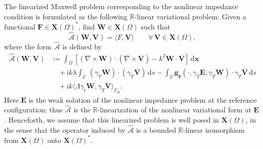 \documentclass[12pt,reqno]{amsart}
\theoremstyle{definition}
\numberwithin{equation}{section}
\begin{document}
The linearized Maxwell problem corresponding to the nonlinear impedance condition is formulated as the following $\mathbb{R}$-linear variational problem: Given a functional $\mathbf{F} \in \mathbf{X}(\Omega)^*$, find $\mathbf{W} \in \mathbf{X}(\Omega)$ such that
\begin{equation}
\widehat{\mathcal{A}}(\mathbf{W}, \mathbf{V}) = \langle F, \mathbf{V} \rangle \qquad \forall \, \mathbf{V} \in \mathbf{X}(\Omega),
\end{equation}
where the form $\widehat{\mathcal{A}}$ is defined by
\begin{equation}
\label{eq:linearized_weak_form}
\begin{aligned}
\widehat{\mathcal{A}}(\mathbf{W}, \mathbf{V}) &:= \int_{\Omega} \left[ (\nabla \times \mathbf{W}) \cdot (\nabla \times \overline{\mathbf{V}}) - k^2 \mathbf{W} \cdot \overline{\mathbf{V}} \right] \, \mathrm{d}\boldsymbol{x} \\
&\quad + \mathrm{i}k \lambda\int_{\Gamma}  \, (\gamma_T \mathbf{W}) \cdot (\gamma_T \overline{\mathbf{V}}) \, \mathrm{d}s - \int_{\Gamma} \mathbf{g}_{\boldsymbol{z}}(\cdot, \gamma_T \mathbf{E}; \gamma_T \mathbf{W}) \cdot \gamma_T \overline{\mathbf{V}} \, \mathrm{d}s \\
&\quad + \mathrm{i}k \langle \Lambda \gamma_t \mathbf{W}, \gamma_T\overline{\mathbf{V}} \rangle_{\Gamma_R}.
\end{aligned}
\end{equation}
 Here \(\mathbf E\) is the weak solution of the nonlinear impedance problem at
the reference configuration; thus \(\widehat{\mathcal A}\) is the
\(\mathbb R\)-linearization of the nonlinear variational form at
\(\mathbf E\). Henceforth, we assume that this linearized problem is well
posed in \(\mathbf X(\Omega)\), in the sense that the operator induced by
\(\widehat{\mathcal A}\) is a bounded \(\mathbb R\)-linear isomorphism from
\(\mathbf X(\Omega)\) onto \(\mathbf X(\Omega)^*\).
\end{document}
